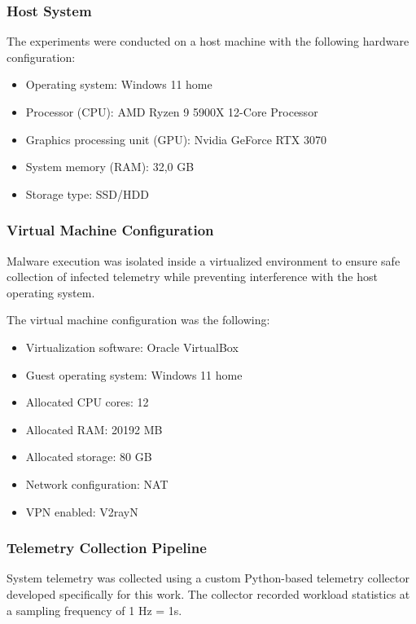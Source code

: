 \documentclass[a4paper,12pt]{extarticle}
\begin{document}
\subsubsection{Host System}

The experiments were conducted on a host machine with the following hardware configuration:

\begin{itemize}
    \item Operating system: Windows 11 home
    \item Processor (CPU): AMD Ryzen 9 5900X 12-Core Processor 
    \item Graphics processing unit (GPU): Nvidia GeForce RTX 3070
    \item System memory (RAM): 32,0 GB
    \item Storage type: SSD/HDD
\end{itemize}

\subsubsection{Virtual Machine Configuration}

Malware execution was isolated inside a virtualized environment to ensure safe collection of infected telemetry while preventing interference with the host operating system.

The virtual machine configuration was the following:

\begin{itemize}
    \item Virtualization software: Oracle VirtualBox
    \item Guest operating system: Windows 11 home
    \item Allocated CPU cores: 12
    \item Allocated RAM: 20192 MB
    \item Allocated storage: 80 GB
    \item Network configuration: NAT
    \item VPN enabled: V2rayN
\end{itemize}

\subsubsection{Telemetry Collection Pipeline}

System telemetry was collected using a custom Python-based telemetry collector developed specifically for this work. The collector recorded workload statistics at a sampling frequency of 1 Hz = 1s.
\end{document}
